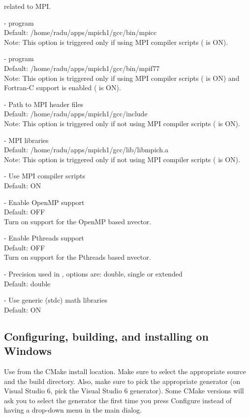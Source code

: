 \begin{description}
  related to MPI.
\item[\id{MPI\_MPICC}] - 
   program
  \\
  Default: /home/radu/apps/mpich1/gcc/bin/mpicc
  \\
  Note: This option is triggered only if using MPI compiler scripts
  ( is ON).
\item[\id{MPI\_MPIF77}] - 
   program
  \\
  Default: /home/radu/apps/mpich1/gcc/bin/mpif77
  \\
  Note: This option is triggered only if using MPI compiler scripts
  ( is ON) and Fortran-C support is enabled
  ( is ON).
\item[\id{MPI\_INCLUDE\_PATH}] - 
  Path to MPI header files
  \\
  Default: /home/radu/apps/mpich1/gcc/include
  \\
  Note: This option is triggered only if not using MPI compiler scripts
  ( is ON).
\item[\id{MPI\_LIBRARIES}] - 
  MPI libraries
  \\
  Default: /home/radu/apps/mpich1/gcc/lib/libmpich.a
  \\
  Note: This option is triggered only if not using MPI compiler scripts
  ( is ON).
\item[\id{MPI\_USE\_MPISCRIPTS}] - 
  Use MPI compiler scripts
  \\
  Default: ON
\item[\id{OPENMP\_ENABLE}] -  
  Enable OpenMP support
  \\
  Default: OFF 
  \\
  Turn on support for the OpenMP based nvector.
\item[\id{PTHREADS\_ENABLE}] -  
  Enable Pthreads support
  \\
  Default: OFF 
  \\
  Turn on support for the Pthreads based nvector.
\item[\id{SUNDIALS\_PRECISION}] -   
  Precision used in {\sundials}, options are: double, single or extended
  \\
  Default: double 
\item[\id{USE\_GENERIC\_MATH}] -   
  Use generic (stdc) math libraries
  \\
  Default: ON 
\end{description}

\subsection{Configuring, building, and installing  on Windows}
Use  from the CMake install location.
Make sure to select the appropriate source and the build directory.
Also, make sure to pick the appropriate generator (on Visual Studio 6, 
pick the Visual Studio 6 generator). Some CMake versions will ask you 
to select the generator the first time you press Configure instead of 
having a drop-down menu in the main dialog. 

